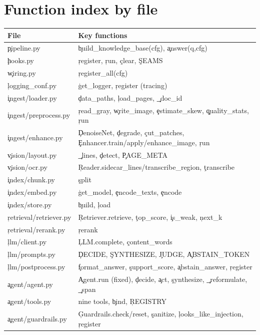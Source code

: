 \section{Function index by file}
\begin{longtable}{@{}p{4.6cm}p{9.9cm}@{}}\toprule File & Key functions \\ \midrule \endhead
\c{pipeline.py} & \c{build\_knowledge\_base(cfg)}, \c{answer(q,cfg)} \\
\c{hooks.py} & \c{register}, \c{run}, \c{clear}, \c{SEAMS} \\
\c{wiring.py} & \c{register\_all(cfg)} \\
\c{logging\_conf.py} & \c{get\_logger}, \c{register} (tracing) \\
\c{ingest/loader.py} & \c{data\_paths}, \c{load\_pages}, \c{\_doc\_id} \\
\c{ingest/preprocess.py} & \c{read\_gray}, \c{write\_image}, \c{estimate\_skew}, \c{quality\_stats}, \c{run} \\
\c{ingest/enhance.py} & \c{DenoiseNet}, \c{degrade}, \c{cut\_patches}, \c{Enhancer.train/apply/enhance\_image}, \c{run} \\
\c{vision/layout.py} & \c{\_lines}, \c{detect}, \c{PAGE\_META} \\
\c{vision/ocr.py} & \c{Reader.sidecar\_lines/transcribe\_region}, \c{transcribe} \\
\c{index/chunk.py} & \c{split} \\
\c{index/embed.py} & \c{get\_model}, \c{encode\_texts}, \c{encode} \\
\c{index/store.py} & \c{build}, \c{load} \\
\c{retrieval/retriever.py} & \c{Retriever.retrieve}, \c{top\_score}, \c{is\_weak}, \c{next\_k} \\
\c{retrieval/rerank.py} & \c{rerank} \\
\c{llm/client.py} & \c{LLM.complete}, \c{content\_words} \\
\c{llm/prompts.py} & \c{DECIDE}, \c{SYNTHESIZE}, \c{JUDGE}, \c{ABSTAIN\_TOKEN} \\
\c{llm/postprocess.py} & \c{format\_answer}, \c{support\_score}, \c{abstain\_answer}, \c{register} \\
\c{agent/agent.py} & \c{Agent.run} (fixed), \c{decide}, \c{act}, \c{synthesize}, \c{\_reformulate}, \c{\_span} \\
\c{agent/tools.py} & nine tools, \c{bind}, \c{REGISTRY} \\
\c{agent/guardrails.py} & \c{Guardrails.check/reset}, \c{sanitize}, \c{looks\_like\_injection}, \c{register} \\

\end{longtable}
